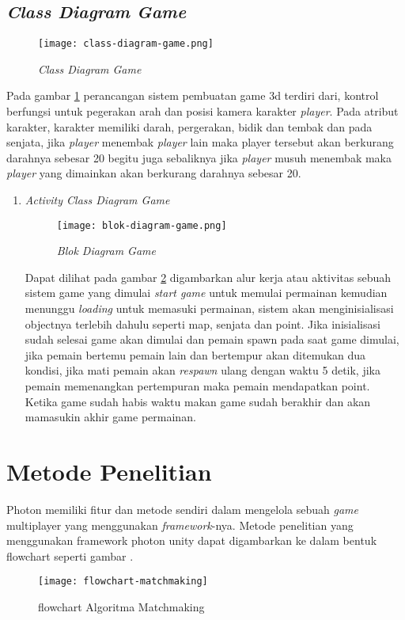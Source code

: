 \subsection{\textit{Class Diagram Game}}
\begin{figure}[h]
   \centering
   \texttt{[image: class-diagram-game.png]}
    \caption{\textit{Class Diagram Game}}
    \label{fig:class-diagram-game}
\end{figure}

Pada gambar \ref{fig:class-diagram-game} perancangan sistem pembuatan game 3d terdiri dari, kontrol berfungsi untuk pegerakan arah dan posisi kamera karakter \textit{player}. Pada atribut karakter, karakter memiliki darah, pergerakan, bidik dan tembak  dan pada senjata, jika \textit{player} menembak \textit{player} lain maka player tersebut akan berkurang darahnya sebesar 20 begitu juga sebaliknya jika \textit{player} musuh menembak maka \textit{player} yang dimainkan akan berkurang darahnya sebesar 20.
\newpage
\begin{enumerate}
    \item \textit{Activity Class Diagram Game}
    \begin{figure}[h]
        \centering
        \texttt{[image: blok-diagram-game.png]}
        \caption{\textit{Blok Diagram Game}}
        \label{fig:aclass-diagram-game}
    \end{figure}

    Dapat dilihat pada gambar \ref{fig:aclass-diagram-game} digambarkan alur kerja atau aktivitas sebuah sistem game yang dimulai \textit{start game} untuk memulai permainan kemudian menunggu \textit{loading} untuk memasuki permainan, sistem akan menginisialisasi objectnya terlebih dahulu seperti map, senjata dan point.
    Jika inisialisasi sudah selesai game akan dimulai dan pemain spawn pada saat game dimulai, jika pemain bertemu pemain lain dan bertempur akan ditemukan dua kondisi, jika mati pemain akan \textit{respawn} ulang dengan waktu 5 detik, jika pemain memenangkan pertempuran maka pemain mendapatkan point.
    Ketika game sudah habis waktu makan game sudah berakhir dan akan mamasukin akhir game permainan.
\end{enumerate}
\newpage

\section{Metode Penelitian}
Photon memiliki fitur dan metode sendiri dalam mengelola sebuah \textit{game} multiplayer yang menggunakan \textit{framework}-nya. Metode penelitian yang menggunakan framework photon unity dapat digambarkan ke dalam bentuk flowchart seperti gambar .
        \begin{figure}[h]
         \centering
         \caption{flowchart Algoritma Matchmaking}
         \texttt{[image: flowchart-matchmaking]}
         \label{fig:algoritmamatmaching}
         \end{figure}

